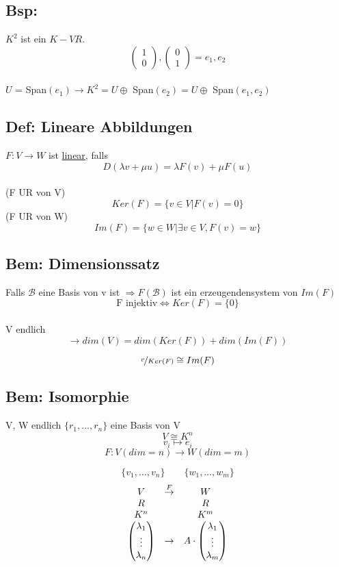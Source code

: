 \documentclass[titlepage,12pt,a4paper,ngerman]{report}
\begin{document}
\subsection{Bsp:} $K^2$ ist ein $K - VR.$\\
$$\begin{pmatrix}1 \\ 0 \end{pmatrix} , \begin{pmatrix}0 \\ 1 \end{pmatrix} = e_1, e_2$$\\
$U$ = Span$(e_1) \rightarrow K^2 = U \oplus$ Span$(e_2) = U \oplus$ Span$(e_1, e_2)$

\subsection{Def: Lineare Abbildungen}
$ F: V\rightarrow W $ ist \underline{linear}, falls $$D(\lambda v+\mu u ) = \lambda F(v) + \mu F(u)$$\\
(F UR von V)
$$ Ker(F) =\{ v \in V \vert  F(v) = 0 \}$$
(F UR von W)
$$ Im(F) = \{ w \in W \vert \exists v \in V, F(v) = w\}$$
\subsection{Bem: Dimensionssatz}
Falls $\mathcal{B}$ eine Basis von v ist $\Rightarrow F(\mathcal{B})$ ist ein erzeugendensystem von $Im(F)$\\ 
$$\textrm{F injektiv} \Leftrightarrow Ker(F) = \{0\}$$\\
V endlich $$\rightarrow dim(V) = dim(Ker(F)) + dim(Im(F))$$

$$ \nicefrac{v}{Ker(F)} \cong Im(F)$$
\subsection{Bem: Isomorphie}
V, W endlich $\{r_1,\dots ,r_n\}$ eine Basis von V
$$ V \cong K^n$$
$$v_i \mapsto e_i$$
$$F: V (dim = n ) \to W (dim = m)$$

$$\{v_1,\dots ,v_n\} \qquad \{w_1,\dots ,w_m\}$$
$$\begin{array}{ccc}
V & \buildrel F \over \rightarrow &  W \\
R & & R \\
K^n & & K^m \\
\begin{pmatrix}
\lambda_1\\
\vdots\\
\lambda_n
\end{pmatrix} & \rightarrow & A \cdot \begin{pmatrix}
\lambda_1 \\
\vdots \\
\lambda_m
\end{pmatrix}
\end{array}$$
\end{document}

